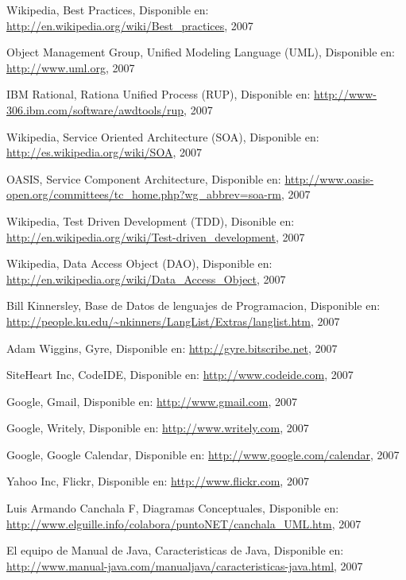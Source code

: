 \begin{thebibliography}{99}
 Wikipedia, Best Practices, Disponible en:
	\url{http://en.wikipedia.org/wiki/Best_practices}, 2007

 Object Management Group, Unified Modeling Language (UML), Disponible en:
	\url{http://www.uml.org}, 2007

 IBM Rational, Rationa Unified Process (RUP), Disponible en:
	\url{http://www-306.ibm.com/software/awdtools/rup}, 2007

 Wikipedia, Service Oriented Architecture (SOA), Disponible en:
	\url{http://es.wikipedia.org/wiki/SOA}, 2007

 OASIS, Service Component Architecture, Disponible en:
	\url{http://www.oasis-open.org/committees/tc_home.php?wg_abbrev=soa-rm}, 2007

 Wikipedia, Test Driven Development (TDD), Disonible en:
	\url{http://en.wikipedia.org/wiki/Test-driven_development}, 2007

 Wikipedia, Data Access Object (DAO), Disponible en:
	\url{http://en.wikipedia.org/wiki/Data_Access_Object}, 2007

 Bill Kinnersley, Base de Datos de lenguajes de Programacion, Disponible en:
	\url{http://people.ku.edu/~nkinners/LangList/Extras/langlist.htm}, 2007

 Adam Wiggins, Gyre, Disponible en:
	\url{http://gyre.bitscribe.net}, 2007

 SiteHeart Inc, CodeIDE, Disponible en:
	\url{http://www.codeide.com}, 2007

 Google, Gmail, Disponible en:
	\url{http://www.gmail.com}, 2007

 Google, Writely, Disponible en:
	\url{http://www.writely.com}, 2007

 Google, Google Calendar, Disponible en:
	\url{http://www.google.com/calendar}, 2007

 Yahoo Inc, Flickr, Disponible en:
	\url{http://www.flickr.com}, 2007

 Luis Armando Canchala F, Diagramas Conceptuales, Disponible en:
	\url{http://www.elguille.info/colabora/puntoNET/canchala_UML.htm}, 2007


 El equipo de Manual de Java, Caracteristicas de Java, Disponible en:
	\url{http://www.manual-java.com/manualjava/caracteristicas-java.html}, 2007

\end{thebibliography}

